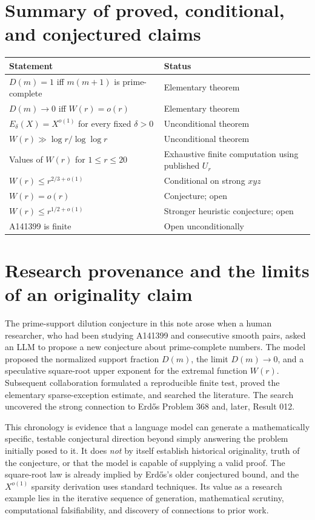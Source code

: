 \documentclass[11pt,letterpaper]{article}
\theoremstyle{remark}
\begin{document}
\section{Summary of proved, conditional, and conjectured claims}
\begin{center}
\small
\begin{tabular}{@{}p{}p{}@{}}
\toprule
Statement & Status\\
\midrule
$D(m)=1$ iff $m(m+1)$ is prime-complete & Elementary theorem\\
$D(m)\to0$ iff $W(r)=o(r)$ & Elementary theorem\\
$E_\delta(X)=X^{o(1)}$ for every fixed $\delta>0$ & Unconditional theorem\\
$W(r)\gg\log r/\log\log r$ & Unconditional theorem\\
Values of $W(r)$ for $1\le r\le20$ & Exhaustive finite computation using published $U_r$\\
$W(r)\le r^{2/3+o(1)}$ & Conditional on strong $xyz$\\
$W(r)=o(r)$ & Conjecture; open\\
$W(r)\le r^{1/2+o(1)}$ & Stronger heuristic conjecture; open\\
A141399 is finite & Open unconditionally\\
\bottomrule
\end{tabular}
\end{center}


\section{Research provenance and the limits of an originality claim}
\label{sec:provenance}
The prime-support dilution conjecture in this note arose when a human
researcher, who had been studying A141399 and consecutive smooth pairs,
asked an LLM to propose a new conjecture about prime-complete numbers.
The model proposed the normalized support fraction $D(m)$, the limit
$D(m)\to0$, and a speculative square-root upper exponent for the
extremal function $W(r)$. Subsequent collaboration formulated a
reproducible finite test, proved the elementary sparse-exception
estimate, and searched the literature. The search uncovered the
strong connection to Erd\H{o}s Problem 368 and, later, Result 012.

This chronology is evidence that a language model can generate a
mathematically specific, testable conjectural direction beyond simply
answering the problem initially posed to it. It does \emph{not}
by itself establish historical originality, truth of the conjecture,
or that the model is capable of supplying a valid proof. The square-root
law is already implied by Erd\H{o}s's older conjectured bound, and the
$X^{o(1)}$ sparsity derivation uses standard techniques. Its value as
a research example lies in the iterative sequence of generation,
mathematical scrutiny, computational falsifiability, and discovery of
connections to prior work.
\end{document}
